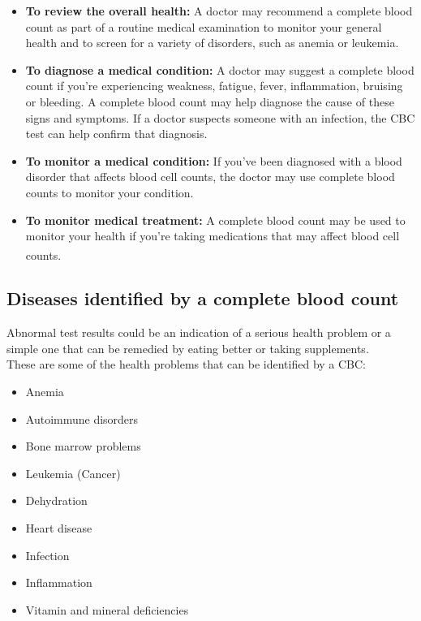 \begin{itemize}
  \item \textbf{To review the overall health:} A doctor may recommend a complete blood count as part of a routine medical examination to monitor your general health and to screen for a variety of disorders, such as anemia or leukemia.
  \item \textbf{To diagnose a medical condition:} A doctor may suggest a complete blood count if you're experiencing weakness, fatigue, fever, inflammation, bruising or bleeding. A complete blood count may help diagnose the cause of these signs and symptoms. If a doctor suspects someone with an infection, the CBC test can help confirm that diagnosis.
  \item \textbf{To monitor a medical condition:} If you've been diagnosed with a blood disorder that affects blood cell counts, the doctor may use complete blood counts to monitor your condition.
  \item \textbf{To monitor medical treatment:} A complete blood count may be used to monitor your health if you're taking medications that may affect blood cell counts. \textsuperscript{\cite{Clicking_On_2022_mayoclinic}}
\end{itemize}

\subsection{Diseases identified by a complete blood count}

Abnormal test results could be an indication of a serious health problem or a simple one that can be remedied by eating better or taking supplements.\\
These are some of the health problems that can be identified by a CBC:

\begin{itemize}
  \item Anemia
  \item Autoimmune disorders
  \item Bone marrow problems
  \item Leukemia (Cancer)
  \item Dehydration
  \item Heart disease
  \item Infection
  \item Inflammation
  \item Vitamin and mineral deficiencies
\end{itemize}
